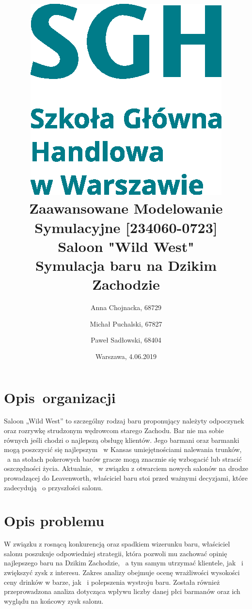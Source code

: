 \documentclass[12pt, a4paper, oneside]{mwart} %
\begin{document}
\title{\includegraphics[width = 0.3 \textwidth]{wykresy/SGHlogotypCMYKpl.eps}\\
\bigskip
Zaawansowane Modelowanie Symulacyjne [234060-0723]\\ 
\bigskip
Saloon "Wild West"\\
Symulacja baru na Dzikim Zachodzie}
\author{Anna Chojnacka, 68729 \and
Michał Puchalski, 67827 \and
Paweł Sadłowski, 68404 }
\date{Warszawa, 4.06.2019}
\maketitle

\pagebreak

\section{Opis~organizacji}
Saloon „Wild West” to szczególny rodzaj baru proponujący należyty odpoczynek oraz rozrywkę strudzonym wędrowcom starego Zachodu. Bar nie ma sobie równych jeśli chodzi o najlepszą obsługę klientów. Jego barmani oraz barmanki mogą poszczycić się najlepszym ~w Kansas umiejętnościami nalewania trunków, ~a na stołach pokerowych barów gracze mogą znacznie się wzbogacić lub stracić oszczędności życia. Aktualnie, ~w związku z otwarciem nowych salonów na drodze prowadzącej do Leavenworth, właściciel baru stoi przed ważnymi decyzjami, które zadecydują ~o przyszłości salonu.

\section{Opis problemu}
W związku z rosnącą konkurencją oraz spadkiem wizerunku baru, właściciel salonu poszukuje odpowiedniej strategii, która pozwoli mu zachować opinię najlepszego baru na Dzikim Zachodzie, ~a tym samym utrzymać klientele, jak ~i zwiększyć zysk z interesu. Zakres analizy obejmuje ocenę wrażliwości wysokości ceny drinków w barze, jak ~i polepszenia wystroju baru. Została również przeprowadzona analiza dotycząca wpływu liczby danej płci barmanów oraz ich wyglądu na końcowy zysk salonu.
\end{document}
